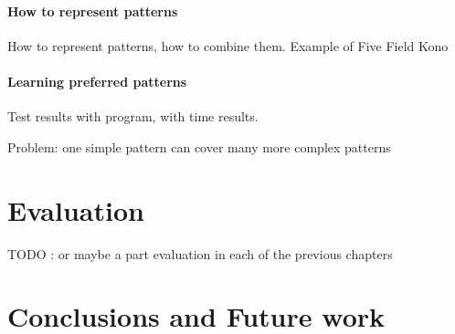 \documentclass[12pt,twoside]{report}
\begin{document}

\subsubsection{How to represent patterns}

How to represent patterns, how to combine them. Example of Five Field Kono

% 

\subsubsection{Learning preferred patterns}

Test results with program, with time results.

Problem: one simple pattern can cover many more complex patterns





\chapter{Evaluation}

TODO : or maybe a part evaluation in each of the previous chapters

\chapter{Conclusions and Future work}
\end{document}
